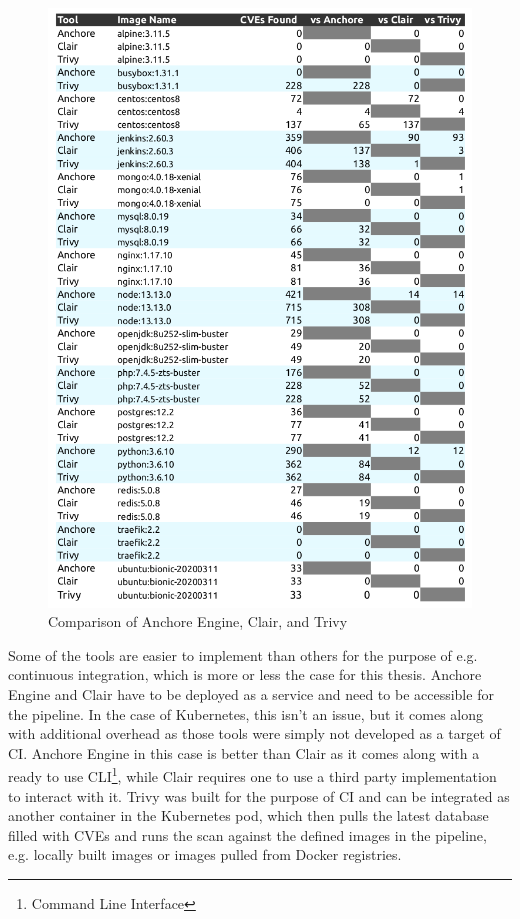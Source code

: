 \begin{figure}[H]
    \centering
    \includegraphics[scale=0.5]{graphics/Docker-Image-Static-Analysis-Tool-Comparison-Table.png}
    \caption{Comparison of Anchore Engine, Clair, and Trivy}
    \label{fig:docker_comparison}
\end{figure}

Some of the tools are easier to implement than others for the purpose of e.g. continuous integration, which is more or less the case for this thesis. Anchore Engine and Clair have to be deployed as a service and need to be accessible for the pipeline. In the case of Kubernetes, this isn't an issue, but it comes along with additional overhead as those tools were simply not developed as a target of CI. Anchore Engine in this case is better than Clair as it comes along with a ready to use CLI\footnote{Command Line Interface}, while Clair requires one to use a third party implementation to interact with it. Trivy was built for the purpose of CI and can be integrated as another container in the Kubernetes pod, which then pulls the latest database filled with CVEs and runs the scan against the defined images in the pipeline, e.g. locally built images or images pulled from Docker registries. 


